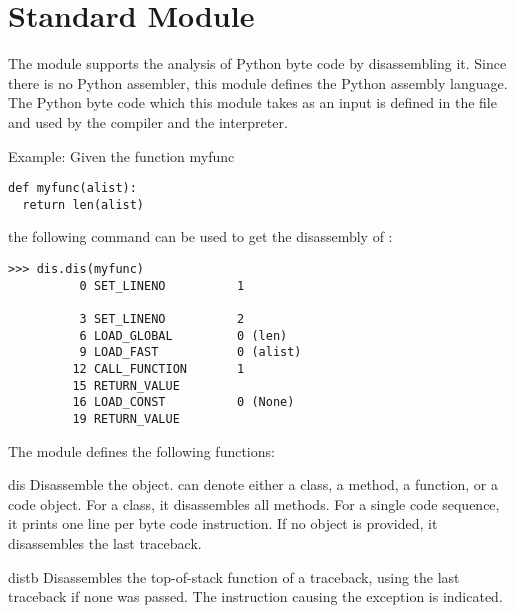 \section{Standard Module }

\label{module-dis}

The  module supports the analysis of Python byte code by
disassembling it.  Since there is no Python assembler, this module
defines the Python assembly language.  The Python byte code which
this module takes as an input is defined in the file 
 and used by the compiler and the interpreter.

Example: Given the function myfunc

\bcode\begin{verbatim}
def myfunc(alist):
  return len(alist)
\end{verbatim}\ecode

the following command can be used to get the disassembly of :

\begin{verbatim}
>>> dis.dis(myfunc)
          0 SET_LINENO          1

          3 SET_LINENO          2
          6 LOAD_GLOBAL         0 (len)
          9 LOAD_FAST           0 (alist)
         12 CALL_FUNCTION       1
         15 RETURN_VALUE   
         16 LOAD_CONST          0 (None)
         19 RETURN_VALUE   
\end{verbatim}

The  module defines the following functions:

\renewcommand{\indexsubitem}{(in module dis)}

\begin{funcdesc}{dis}{}
Disassemble the  object.  can denote
either a class, a method, a function, or a code object.  For a class,
it disassembles all methods.  For a single code sequence, it prints
one line per byte code instruction.  If no object is provided, it
disassembles the last traceback.
\end{funcdesc}

\begin{funcdesc}{distb}{}
Disassembles the top-of-stack function of a traceback, using the last
traceback if none was passed.  The instruction causing the exception
is indicated.
\end{funcdesc}

